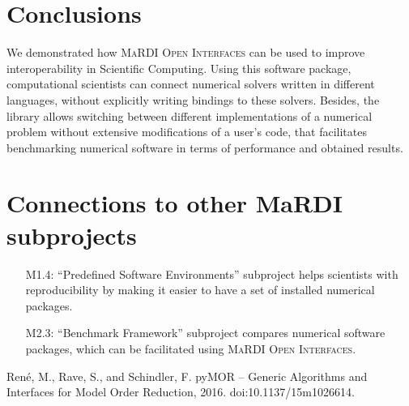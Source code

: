 \documentclass{mmposter}
\newcommand{\OIF}{\textsc{MaRDI Open Interfaces}\xspace}
\begin{document}
\section*{Conclusions}
We demonstrated how \OIF{} can be used to improve
interoperability in Scientific Computing.
Using this software package, computational scientists can connect numerical
solvers written in different languages, without explicitly writing bindings
to these solvers.
Besides, the library allows switching between different implementations
of a numerical problem without extensive modifications of a user's code,
that facilitates benchmarking numerical software in terms of performance
and obtained results.


\section*{Connections to other MaRDI subprojects}

\begin{itemize}[align=left]
  \item[\color{CEmphasis1}M1.4:] ``Predefined Software Environments'' subproject
        helps scientists with reproducibility by making it easier to have
        a set of installed numerical packages.
  \item[\color{CEmphasis1}M2.3:] ``Benchmark Framework'' subproject
        compares numerical software packages, which can be facilitated
        using \OIF{}.
\end{itemize}

\begin{thebibliography}{1}
  \setlength{\itemsep}{1pt}
  \setlength{\parskip}{1.5pt}

  \scriptsize{

  Ren{\'{e}}, M., Rave, S., and Schindler, F.
  \newblock pyMOR -- Generic Algorithms and Interfaces for Model Order Reduction, 2016.
  \newblock doi:10.1137/15m1026614.
  }
\end{thebibliography}
\end{document}
